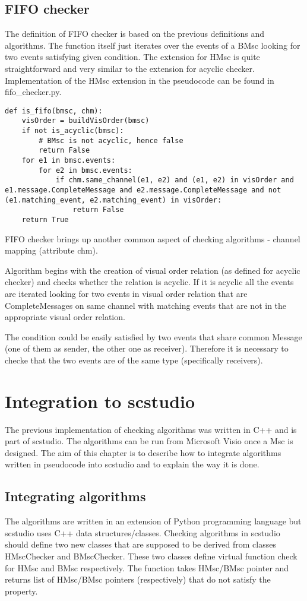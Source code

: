 \documentclass[11pt,oneside]{fithesis2}
\begin{document}
\section{FIFO checker}

The definition of FIFO checker is based on the previous definitions and algorithms. The function itself just iterates over the events of a BMsc looking for two events satisfying given condition. The extension for HMsc is quite straightforward and very similar to the extension for acyclic checker. Implementation of the HMsc extension in the pseudocode can be found in fifo\_checker.py.
\begin{lstlisting}
def is_fifo(bmsc, chm):
    visOrder = buildVisOrder(bmsc)
    if not is_acyclic(bmsc):
        # BMsc is not acyclic, hence false
        return False
    for e1 in bmsc.events:
        for e2 in bmsc.events:
            if chm.same_channel(e1, e2) and (e1, e2) in visOrder and e1.message.CompleteMessage and e2.message.CompleteMessage and not (e1.matching_event, e2.matching_event) in visOrder:
                return False
    return True
\end{lstlisting}

FIFO checker brings up another common aspect of checking algorithms - channel mapping (attribute chm).

Algorithm begins with the creation of visual order relation (as defined for acyclic checker) and checks whether the relation is acyclic. If it is acyclic all the events are iterated looking for two events in visual order relation that are CompleteMessages on same channel with matching events that are not in the appropriate visual order relation.

The condition could be easily satisfied by two events that share common Message (one of them as sender, the other one as receiver). Therefore it is necessary to checke that the two events are of the same type (specifically receivers).

\chapter{Integration to scstudio}
The previous implementation of checking algorithms was written in C++ and is part of scstudio. The algorithms can be run from Microsoft Visio once a Msc is designed.
The aim of this chapter is to describe how to integrate algorithms written in pseudocode into scstudio and to explain the way it is done.
\section{Integrating algorithms}
The algorithms are written in an extension of Python programming language but scstudio uses C++ data structures/classes. Checking algorithms in scstudio should define two new classes that are supposed to be derived from classes HMscChecker and BMscChecker. These two classes define virtual function check for HMsc and BMsc respectively. The function takes HMsc/BMsc pointer and returns list of HMsc/BMsc pointers (respectively) that do not satisfy the property.
\end{document}
